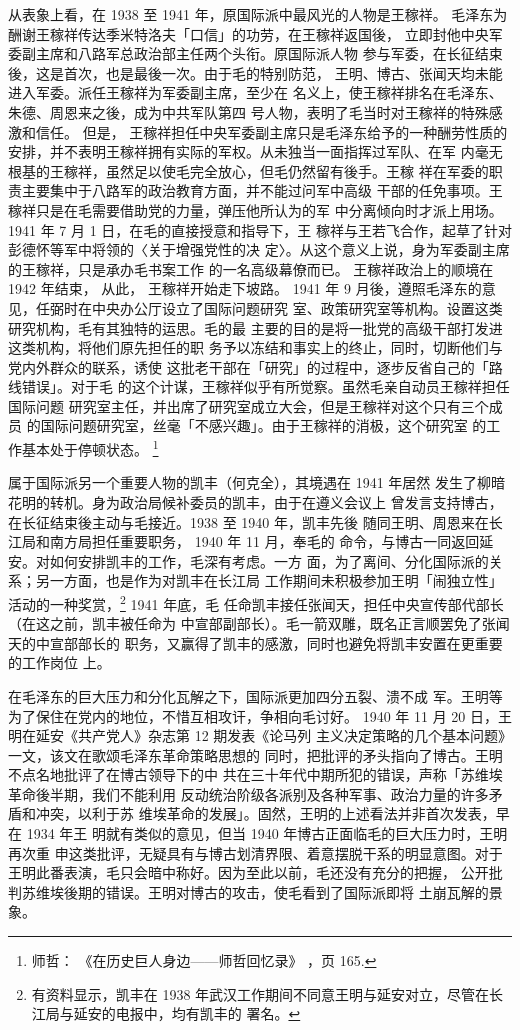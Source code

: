 从表象上看，在 1938 至 1941 年，原国际派中最风光的人物是王稼祥。
毛泽东为酬谢王稼祥传达季米特洛夫「口信」的功劳，在王稼祥返国後，
立即封他中央军委副主席和八路军总政治部主任两个头衔。原国际派人物
参与军委，在长征结束後，这是首次，也是最後一次。由于毛的特别防范，
王明、博古、张闻天均未能进入军委。派任王稼祥为军委副主席，至少在
名义上，使王稼祥排名在毛泽东、朱德、周恩来之後，成为中共军队第四
号人物，表明了毛当时对王稼祥的特殊感激和信任。
但是，
王稼祥担任中央军委副主席只是毛泽东给予的一种酬劳性质的
安排，并不表明王稼祥拥有实际的军权。从未独当一面指挥过军队、在军
内毫无根基的王稼祥，虽然足以使毛完全放心，但毛仍然留有後手。王稼
祥在军委的职责主要集中于八路军的政治教育方面，并不能过问军中高级
干部的任免事项。王稼祥只是在毛需要借助党的力量，弹压他所认为的军
中分离倾向时才派上用场。1941 年 7 月 1 日，在毛的直接授意和指导下，王
稼祥与王若飞合作，起草了针对彭德怀等军中将领的〈关于增强党性的决
定〉。从这个意义上说，身为军委副主席的王稼祥，只是承办毛书案工作
的一名高级幕僚而已。
王稼祥政治上的顺境在 1942 年结束，
从此，
王稼祥开始走下坡路。
1941
年 9 月後，遵照毛泽东的意见，任弼时在中央办公厅设立了国际问题研究
室、政策研究室等机构。设置这类研究机构，毛有其独特的运思。毛的最
主要的目的是将一批党的高级干部打发进这类机构，将他们原先担任的职
务予以冻结和事实上的终止，同时，切断他们与党内外群众的联系，诱使
这批老干部在「研究」的过程中，逐步反省自己的「路线错误」。对于毛
的这个计谋，王稼祥似乎有所觉察。虽然毛亲自动员王稼祥担任国际问题
研究室主任，并出席了研究室成立大会，但是王稼祥对这个只有三个成员
的国际问题研究室，丝毫「不感兴趣」。由于王稼祥的消极，这个研究室
的工作基本处于停顿状态。
\footnote{师哲：
《在历史巨人身边——师哲回忆录》
，页 165. }

属于国际派另一个重要人物的凯丰（何克全），其境遇在 1941 年居然
发生了柳暗花明的转机。身为政治局候补委员的凯丰，由于在遵义会议上
曾发言支持博古，在长征结束後主动与毛接近。1938 至 1940 年，凯丰先後
随同王明、周恩来在长江局和南方局担任重要职务， 1940 年 11 月，奉毛的
命令，与博古一同返回延安。对如何安排凯丰的工作，毛深有考虑。一方
面，为了离间、分化国际派的关系；另一方面，也是作为对凯丰在长江局
工作期间未积极参加王明「闹独立性」活动的一种奖赏，\footnote{有资料显示，凯丰在  1938 年武汉工作期间不同意王明与延安对立，尽管在长江局与延安的电报中，均有凯丰的
署名。} 1941 年底，毛
任命凯丰接任张闻天，担任中央宣传部代部长（在这之前，凯丰被任命为
中宣部副部长）。毛一箭双雕，既名正言顺罢免了张闻天的中宣部部长的
职务，又赢得了凯丰的感激，同时也避免将凯丰安置在更重要的工作岗位
上。

在毛泽东的巨大压力和分化瓦解之下，国际派更加四分五裂、溃不成
军。王明等为了保住在党内的地位，不惜互相攻讦，争相向毛讨好。
1940 年 11 月 20 日，王明在延安《共产党人》杂志第 12 期发表《论马列
主义决定策略的几个基本问题》一文，该文在歌颂毛泽东革命策略思想的
同时，把批评的矛头指向了博古。王明不点名地批评了在博古领导下的中
共在三十年代中期所犯的错误，声称「苏维埃革命後半期，我们不能利用
反动统治阶级各派别及各种军事、政治力量的许多矛盾和冲突，以利于苏
维埃革命的发展」。固然，王明的上述看法并非首次发表，早在 1934 年王
明就有类似的意见，但当 1940 年博古正面临毛的巨大压力时，王明再次重
申这类批评，无疑具有与博古划清界限、着意摆脱干系的明显意图。对于
王明此番表演，毛只会暗中称好。因为至此以前，毛还没有充分的把握，
公开批判苏维埃後期的错误。王明对博古的攻击，使毛看到了国际派即将
土崩瓦解的景象。

